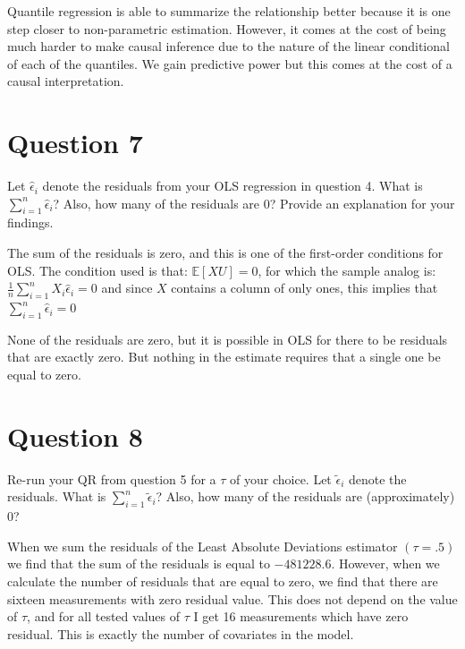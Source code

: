 \documentclass[12pt]{paper}
\newcommand{\exV}[1]{\mathbb{E} \left [ #1 \right ]}
\begin{document}
Quantile regression is able to summarize the relationship better
because it is one step closer to non-parametric estimation. However,
it comes at the cost of being much harder to make causal inference
due to the nature of the linear conditional of each of the
quantiles. We gain predictive power but this comes at the cost of a
causal interpretation.

\section*{Question 7}

Let $\hat{\epsilon}_i$ denote the residuals from your OLS regression in
question 4. What is $\sum_{i=1}^n \hat{\epsilon}_i$? Also, how many of the
residuals are 0? Provide an explanation for your findings.

\vspace{.3in}


The sum of the residuals is zero, and this is one of the first-order
conditions for OLS. The condition used is that: $\exV{X U} = 0$, for
which the sample analog is:
$\frac{1}{n}\sum_{i=1}^n X_i \hat{\epsilon}_i = 0$ and since $X$ contains a
column of only ones, this implies that $\sum_{i=1}^n \hat{\epsilon}_i = 0$

None of the residuals are zero, but it is possible in OLS for there to
be residuals that are exactly zero. But nothing in the estimate
requires that a single one be equal to zero.

\section*{Question 8}

Re-run your QR from question 5 for a $\tau$ of your choice. Let
$\tilde{\epsilon}_i$ denote the residuals. What is $\sum_{i=1}^n \tilde{\epsilon}_i$?
Also, how many of the residuals are (approximately) 0?
\vspace{.3in}

When we sum the residuals of the Least Absolute Deviations estimator
$(\tau = .5)$ we find that the sum of the residuals is equal to
$-481228.6$. However, when we calculate the number of residuals that
are equal to zero, we find that there are sixteen measurements with
zero residual value. This does not depend on the value of $\tau$, and for
all tested values of $\tau$ I get 16 measurements which have zero
residual. This is exactly the number of covariates in the model. 
\end{document}
